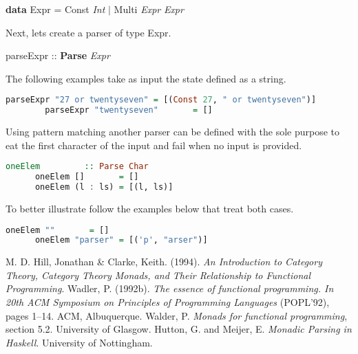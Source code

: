 \documentclass[a4paper, onecolumn]{article}
\begin{document}
    \begin{center}
        \textbf{data} Expr = Const \textit{Int} $\vert$ Multi \textit{Expr} \textit{Expr} 
    \end{center}
    
    Next, lets create a parser of type Expr. 
    
    \begin{center}
        parseExpr :: \textbf{Parse} \textit{Expr} 
    \end{center}
    
    The following examples take as input the state defined as a string. 
    
    \begin{lstlisting}[language=Haskell]
        parseExpr "27 or twentyseven" = [(Const 27, " or twentyseven")] 
        parseExpr "twentyseven"       = []
    \end{lstlisting}
    
    Using pattern matching another parser can be defined with the sole purpose to eat the first character of the input and fail when no input is provided. 
    
    \begin{tcolorbox}
      \begin{lstlisting}[language=Haskell]
      oneElem         :: Parse Char
      oneElem []       = []
      oneElem (l : ls) = [(l, ls)]
     \end{lstlisting}
    \end{tcolorbox}
    
    To better illustrate follow the examples below that treat both cases.
    
      \begin{lstlisting}[language=Haskell]
      oneElem ""       = []
      oneElem "parser" = [('p', "arser")]
     \end{lstlisting}
    
    
    \begin{thebibliography}{9}
    M. D. Hill, Jonathan & Clarke, Keith. (1994). \textit{An Introduction to Category Theory, Category Theory Monads, and Their Relationship to Functional Programming}.
    Wadler, P. (1992b). \textit{The essence of functional programming. In
    20th ACM Symposium on Principles of Programming Languages}
    (POPL’92), pages 1–14. ACM, Albuquerque.
    Walder, P. \textit{Monads for functional programming}, section 5.2. University of Glasgow. 
    Hutton, G. and Meijer, E. \textit{Monadic Parsing in Haskell}. University of Nottingham.
    \end{thebibliography}
    
\end{document}
